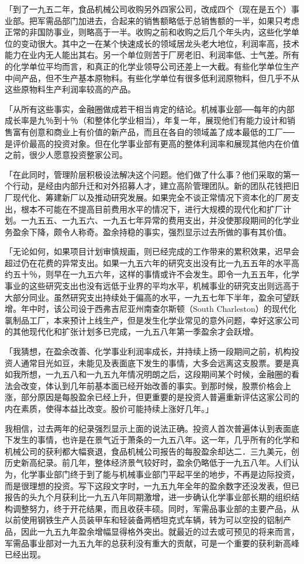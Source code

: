 \documentclass[UTF8,a4paper,zihao=-4,fontset = windows]{ctexart} %
\begin{document}
「到了一九五二年，食品机械公司收购另外四家公司，改成四个（现在是五个）事业部。把军需品部门加进去，合起来的销售额略低于总销售额的一半，如果只考虑正常的非国防事业，则略高于一半。收购之前和收购之后几个年头内，这些化学单位的变动很大。其中之一在某个快速成长的领域居龙头老大地位，利润率高，技术能力在业内无人能出其右。另一个单位则苦于厂房老旧、利润率低、士气差。所有的化学单位平均而言，和真正的化学业领导公司还差上一大截。有些化学单位生产中间产品，但不生产基本原物料。有些化学单位有很多低利润原物料，但几乎不从这些原物料生产利润率较高的产品。

「从所有这些事实，金融圈做成若干相当肯定的结论。机械事业部──每年的内部成长率是九％到十％（和整体化学业相当），年复一年，展现他们有能力设计和销售富有创意和商业上有价值的新产品，而且在各自的领域盖了成本最低的工厂──是评价最高的投资对象。但在化学事业部有更高的整体利润率和展现其他内在价值之前，很少人愿意投资整家公司。

「在此同时，管理阶层积极设法解决这个问题。他们做了什么事？他们采取的第一个行动，是经由内部升迁和对外招募人才，建立高阶管理团队。新的团队花钱把旧厂现代化、筹建新厂以及推动研究发展。如果完全不谈正常情况下资本化的厂房支出，根本不可能在不提高目前费用水平的情况下，进行大规模的现代化和扩厂计划。一九五五、一九五六、一九五七年异常的费用支出，并没使那段期间的化学业务盈余下降，颇令人称奇。盈余持稳的事实，强烈显示过去所做的事有其价值。

「无论如何，如果项目计划审慎规画，则已经完成的工作带来的累积效果，迟早会超过仍在花费的异常支出。如果一九五六年的研究支出没有比一九五五年的水平高约五十％，则早在一九五六年，这样的事情或许不会发生。即令一九五五年，化学事业的这些研究支出也没有远低于业界的平均水平，机械事业的研究支出则远高于大部分同业。虽然研究支出持续处于偏高的水平，一九五七年下半年，盈余可望跃增。年中时，该公司设于西弗吉尼亚州南查尔斯顿（South Charleston）的现代化氯制品工厂，本来预计上线生产，但是发生化学业常见的意外问题，幸好这家公司的其他现代化和扩张计划多已完成，一九五八年第一季盈余才会跃增。

「我猜想，在盈余改善、化学事业利润率成长，并持续上扬一段期间之前，机构投资人通常目光如豆，未能见及表面底下发生的事情，大多会远离这支股票。要是真如我所想，一九五八和一九五九年情况明朗之后，这段期间某个时候，金融圈的看法会改变，体认到几年前基本面已经开始改善的事实。到那时候，股票价格会上涨，部分原因是每股盈余已经上升，但更重要的是投资人普遍重新评估这家公司的内在素质，使得本益比改变。股价可能持续上涨好几年。」

我相信，过去两年的纪录强烈显示上面的说法正确。投资人首次普遍体认到表面底下发生的事情，也许是在景气近于萧条的一九五八年。这一年，几乎所有的化学和机械公司的获利都大幅衰退，食品机械公司报告的每股盈余却达二．三九美元，创历史新高纪录。前几年，整体经济景气较好时，盈余仍略低于一九五八年。人们认为，化学事业部门终于到了能与机械事业部门平起平坐的地步，不再是边际投资，而是很理想的投资。写下这段文字时，一九五九年全年的盈余数字还没发表，但已报告的头九个月获利比一九五八年同期激增，进一步确认化学事业部长期的组织结构调整努力，终于开花结果，而且收获丰硕。同时，军需品事业部的主要产品，从以前使用钢铁生产人员装甲车和轻装备两栖坦克式车辆，转为可以空投的铝制产品，因此一九五九年盈余增幅显得格外突出。就最近的过去或可预见的将来而言，军需品事业部对一九五九年的总获利没有重大的贡献，可是一个重要的获利新高峰已经出现。
\end{document}
